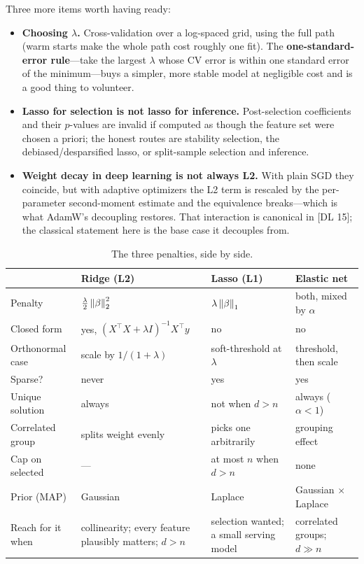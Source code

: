 Three more items worth having ready:
\begin{itemize}
    \item \textbf{Choosing $\lambda$.} Cross-validation over a log-spaced grid, using the full path (warm starts make the whole path cost roughly one fit). The \textbf{one-standard-error rule}---take the largest $\lambda$ whose CV error is within one standard error of the minimum---buys a simpler, more stable model at negligible cost and is a good thing to volunteer.
    \item \textbf{Lasso for selection is not lasso for inference.} Post-selection coefficients and their $p$-values are invalid if computed as though the feature set were chosen a priori; the honest routes are stability selection, the debiased/desparsified lasso, or split-sample selection and inference.
    \item \textbf{Weight decay in deep learning is not always L2.} With plain SGD they coincide, but with adaptive optimizers the L2 term is rescaled by the per-parameter second-moment estimate and the equivalence breaks---which is what AdamW's decoupling restores. That interaction is canonical in [DL 15]; the classical statement here is the base case it decouples from.
\end{itemize}

\begin{table}[H]
\centering\small
\setlength{\tabcolsep}{4pt}
\caption{The three penalties, side by side.}
\label{cml:tab:penalties}
\begin{tabularx}{\textwidth}{@{}>{\raggedright\arraybackslash}p{2.45cm} X X X@{}}
\toprule
& \textbf{Ridge (L2)} & \textbf{Lasso (L1)} & \textbf{Elastic net} \\
\midrule
Penalty & $\tfrac{\lambda}{2}\left\lVert\beta\right\rVert_2^2$ & $\lambda\left\lVert\beta\right\rVert_1$ & both, mixed by $\alpha$ \\
Closed form & yes, $(X^{\top}X{+}\lambda I)^{-1}X^{\top}y$ & no & no \\
Orthonormal case & scale by $1/(1{+}\lambda)$ & soft-threshold at $\lambda$ & threshold, then scale \\
Sparse? & never & yes & yes \\
Unique solution & always & not when $d>n$ & always ($\alpha<1$) \\
Correlated group & splits weight evenly & picks one arbitrarily & grouping effect \\
Cap on selected & --- & at most $n$ when $d>n$ & none \\
Prior (MAP) & Gaussian & Laplace & Gaussian $\times$ Laplace \\
Reach for it when & collinearity; every feature plausibly matters; $d>n$ & selection wanted; a small serving model & correlated groups; $d \gg n$ \\
\bottomrule
\end{tabularx}
\end{table}

